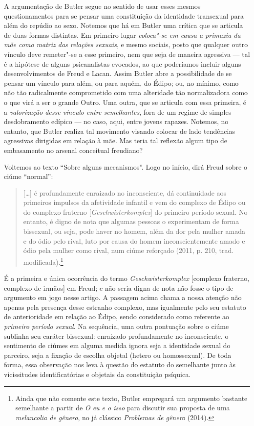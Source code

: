 A argumentação de Butler segue no sentido de usar esses mesmos
questionamentos para se pensar uma constituição da identidade transexual
para além do repúdio ao sexo. Notemos que há em Butler uma crítica que
se articula de duas formas distintas. Em primeiro lugar \emph{coloca"-se
em causa a primazia da mãe como matriz das relações sexuais}, e mesmo
sociais, posto que qualquer outro vínculo deve remeter"-se a esse
primeiro, nem que seja de maneira agressiva --- tal é a hipótese de
alguns psicanalistas evocados, ao que poderíamos incluir alguns
desenvolvimentos de Freud e Lacan. Assim Butler abre a possibilidade de
se pensar um vínculo para além, ou para aquém, do Édipo; ou, no mínimo,
como não tão radicalmente comprometido com uma alteridade tão
normalizadora como o que virá a ser o grande Outro. Uma outra, que se
articula com essa primeira, é a \emph{valorização desse vínculo entre
semelhantes}, fora de um regime de simples desdobramento edípico --- no
caso, aqui, entre jovens rapazes. Notemos, no entanto, que Butler
realiza tal movimento visando colocar de lado tendências agressivas
dirigidas em relação à mãe. Mas teria tal reflexão algum tipo de
embasamento no arsenal conceitual freudiano?

Voltemos ao texto ``Sobre alguns mecanismos''. Logo no início,
dirá Freud sobre o ciúme ``normal'':

\begin{quote}
{[}\ldots{}{]} é profundamente enraizado no inconsciente, dá continuidade aos
primeiros impulsos da afetividade infantil e vem do complexo de Édipo ou
do complexo fraterno {[}\emph{Geschwisterkomplex}{]} do primeiro período
sexual. No entanto, é digno de nota que algumas pessoas o experimentam
de forma bissexual, ou seja, pode haver no homem, além da dor pela
mulher amada e do ódio pelo rival, luto por causa do homem
inconscientemente amado e ódio pela mulher como rival, num ciúme
reforçado (2011, p. 210, trad. modificada).\footnote{Ainda
  que não comente este texto, Butler empregará um argumento bastante
  semelhante a partir de \emph{O eu e o isso} para discutir sua proposta
  de uma \emph{melancolia de gênero}, no já clássico \emph{Problemas de
    gênero} (2014).}
\end{quote}

É a primeira e única ocorrência do termo \emph{Geschwisterkomplex}
{[}complexo fraterno, complexo de irmãos{]} em Freud; e não seria digna
de nota não fosse o tipo de argumento em jogo nesse artigo. A passagem
acima chama a nossa atenção não apenas pela presença desse estranho
complexo, mas igualmente pelo seu estatuto de anterioridade em relação
ao Édipo, sendo considerado como referente ao \emph{primeiro período
sexual}. Na sequência, uma outra pontuação sobre o ciúme sublinha seu
caráter bissexual: enraizado profundamente no inconsciente, o sentimento
de ciúmes em alguma medida ignora seja a identidade sexual do parceiro,
seja a fixação de escolha objetal (hetero ou homossexual). De toda
forma, essa observação nos leva à questão do estatuto do semelhante
junto às vicissitudes identificatórias e objetais da constituição
psíquica.

